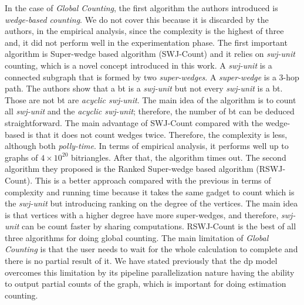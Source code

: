 In the case of \emph{Global Counting}, the first algorithm the authors introduced is \emph{wedge-based counting}. We do not cover this because it is discarded
by the authors, in the empirical analysis, since the complexity is the highest of three and, it did not perform well in the experimentation phase.
The first important algorithm is Super-wedge based algorithm (SWJ-Count) and it relies on \emph{swj-unit} counting, which is a novel concept introduced in this work. A \emph{swj-unit} is a connected subgraph that is formed by two \emph{super-wedges}. A \emph{super-wedge}
is a 3-hop path. The authors show that a \acrshort{bt} is a \emph{swj-unit} but not every \emph{swj-unit} is a \acrshort{bt}. Those 
are not \acrshort{bt} are \emph{acyclic swj-unit}. The main idea of the algorithm is to count all \emph{swj-unit} and the \emph{acyclic swj-unit}; therefore,
the number of \acrshort{bt} can be deduced straightforward.
The main advantage of SWJ-Count compared with the wedge-based is that it does not count wedges twice.
Therefore, the complexity is less, although both \emph{polly-time}.
In terms of empirical analysis, it performs well up to graphs of $4 \times 10^20$ bitriangles. After that, the algorithm times out.
The second algorithm they proposed is the Ranked Super-wedge based algorithm (RSWJ-Count). This is a better approach compared with the previous in terms of complexity and running time because it takes the same gadget to count which is the \emph{swj-unit} but introducing ranking on the degree of the vertices. The main idea is that vertices with a higher degree have more super-wedges, 
and therefore, \emph{swj-unit} can be count faster by sharing computations. RSWJ-Count is the best of all three algorithms for doing global counting.
The main limitation of \emph{Global Counting} is that the user needs to wait for the whole calculation to complete and there is no partial result of it.
We have stated previously that the  \acrshort{dp} model overcomes this limitation by its pipeline parallelization nature having the ability to output partial counts of the graph, which is important for doing estimation counting.


